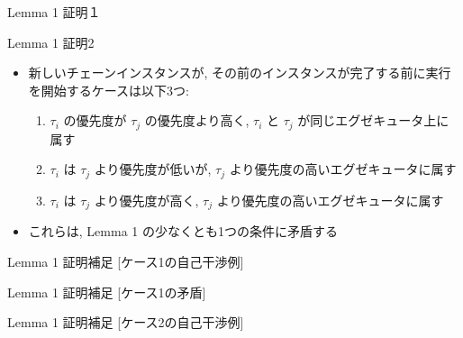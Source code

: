 \begin{frame}{Lemma 1 証明１}
\end{frame}

\begin{frame}{Lemma 1 証明2}
    \begin{itemize}
        \item 新しいチェーンインスタンスが, その前のインスタンスが完了する前に実行を開始するケースは以下3つ:
              \begin{enumerate}
                  \item $\tau_{i}$ の優先度が $\tau_{j}$ の優先度より高く, $\tau_{i}$ と $\tau_{j}$ が同じエグゼキュータ上に属す
                  \item $\tau_{i}$ は $\tau_{j}$ より優先度が低いが, $\tau_{j}$ より優先度の高いエグゼキュータに属す
                  \item $\tau_{i}$ は $\tau_{j}$ より優先度が高く,  $\tau_{j}$ より優先度の高いエグゼキュータに属す
              \end{enumerate}
        \item これらは, Lemma 1 の少なくとも1つの条件に矛盾する
    \end{itemize}
\end{frame}

\begin{frame}{Lemma 1 証明補足 [ケース1の自己干渉例]}
\end{frame}

\begin{frame}{Lemma 1 証明補足 [ケース1の矛盾]}
\end{frame}

\begin{frame}{Lemma 1 証明補足 [ケース2の自己干渉例]}
\end{frame}

